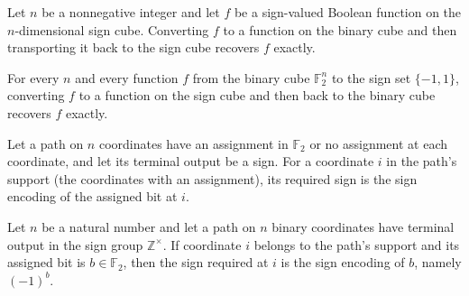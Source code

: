 \begin{theorem}
\label{FABL.booleanFunctionOfBinary_binaryOfBooleanFunction}
\leanok
{}
Let $n$ be a nonnegative integer and let $f$ be a sign-valued Boolean function on the
$n$-dimensional sign cube. Converting $f$ to a function on the binary cube and then
transporting it back to the sign cube recovers $f$ exactly.
\end{theorem}

\begin{theorem}
\label{FABL.binaryOfBooleanFunction_booleanFunctionOfBinary}
\leanok
{}
For every $n$ and every function $f$ from the binary cube $\mathbb F_2^n$ to the sign
set $\{-1,1\}$, converting $f$ to a function on the sign cube and then back to the
binary cube recovers $f$ exactly.
\end{theorem}

\begin{definition}
\leanok
{}
Let a path on $n$ coordinates have an assignment in $\mathbb F_2$ or no assignment at
each coordinate, and let its terminal output be a sign. For a coordinate $i$ in the
path's support (the coordinates with an assignment), its required sign is the sign
encoding of the assigned bit at $i$.
\end{definition}

\begin{theorem}
\leanok
{}
Let $n$ be a natural number and let a path on $n$ binary coordinates have terminal
output in the sign group $\mathbb{Z}^{\times}$. If coordinate $i$ belongs to the path's
support and its assigned bit is $b\in\mathbb{F}_2$, then the sign required at $i$ is the
sign encoding of $b$, namely $(-1)^b$.
\end{theorem}

